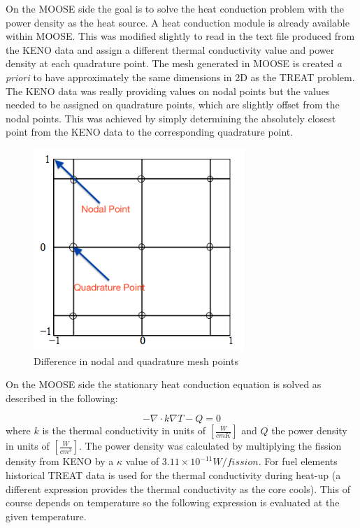 \documentclass[11pt]{article}
\begin{document}
	On the MOOSE side the goal is to solve the heat conduction problem with the power density as the heat source. A heat conduction module is already available within MOOSE.  This was modified slightly to read in the text file produced from the KENO data and assign a different thermal conductivity value and power density at each quadrature point.  The mesh generated in MOOSE is created \emph{a priori} to have approximately the same dimensions in 2D as the TREAT problem.  The KENO data was really providing values on nodal points but the values needed to be assigned on quadrature points, which are slightly offset from the nodal points.  This was achieved by simply determining the absolutely closest point from the KENO data to the corresponding quadrature point. 
	
\begin{figure}[h]
    \centering
    \includegraphics[width=8cm]{figures/nodalvsquad.png}
    \caption{Difference in nodal and quadrature mesh points}
    \label{fig:nodalquad}
\end{figure}

On the MOOSE side the stationary heat conduction equation is solved as described in the following:

\begin{equation}
    -\nabla \cdot k\nabla T - Q = 0
\end{equation}
where $k$ is the thermal conductivity in units of $[\frac{W}{cm K}]$  and $Q$ the power density in units of $[\frac{W}{cm^3}]$. The power density was calculated by multiplying the fission density from KENO by a $\kappa$ value of $3.11 \times 10^{-11} W/fission$. For fuel elements historical TREAT data is used for the thermal conductivity during heat-up (a different expression provides the thermal conductivity as the core cools).  This of course depends on temperature so the following expression is evaluated at the given temperature.
\end{document}
